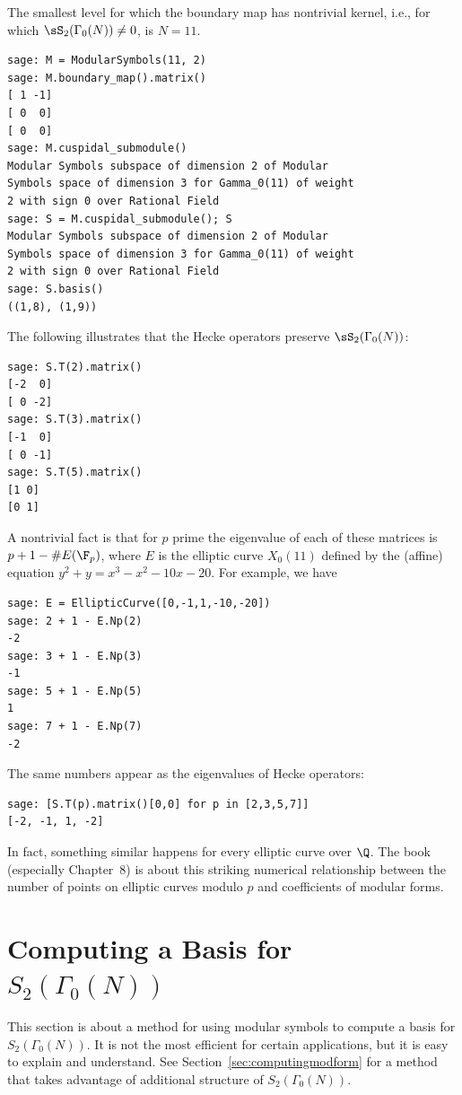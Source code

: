 The smallest level for which the boundary map has nontrivial kernel,
i.e., for which $\sS_2(\Gamma_0(N))\neq 0$, is $N=11$.
\begin{verbatim}
sage: M = ModularSymbols(11, 2)
sage: M.boundary_map().matrix()
[ 1 -1]
[ 0  0]
[ 0  0]
sage: M.cuspidal_submodule()
Modular Symbols subspace of dimension 2 of Modular 
Symbols space of dimension 3 for Gamma_0(11) of weight 
2 with sign 0 over Rational Field
sage: S = M.cuspidal_submodule(); S
Modular Symbols subspace of dimension 2 of Modular 
Symbols space of dimension 3 for Gamma_0(11) of weight 
2 with sign 0 over Rational Field
sage: S.basis()
((1,8), (1,9))
\end{verbatim}%

The following illustrates that the
Hecke operators preserve $\sS_2(\Gamma_0(N))$:
\begin{verbatim}
sage: S.T(2).matrix()
[-2  0]
[ 0 -2]
sage: S.T(3).matrix()
[-1  0]
[ 0 -1]
sage: S.T(5).matrix()
[1 0]
[0 1]
\end{verbatim}%

A nontrivial fact is that for $p$ prime the eigenvalue of each
of these matrices is $p+1 - \#E(\F_p)$, where $E$ is the
elliptic curve $X_0(11)$ defined by the (affine) equation
$y^2 + y = x^3 - x^2 - 10x - 20.$ 
For example, we have
\begin{verbatim}
sage: E = EllipticCurve([0,-1,1,-10,-20])
sage: 2 + 1 - E.Np(2)
-2
sage: 3 + 1 - E.Np(3)
-1
sage: 5 + 1 - E.Np(5)
1
sage: 7 + 1 - E.Np(7)
-2
\end{verbatim}%

The same numbers appear as the eigenvalues
of Hecke operators:
\begin{verbatim}
sage: [S.T(p).matrix()[0,0] for p in [2,3,5,7]]
[-2, -1, 1, -2]
\end{verbatim}
In fact, something similar happens for every elliptic curve over $\Q$.
The book \cite{diamond-shurman} (especially Chapter~8) is about this
striking numerical relationship between the number of 
points on elliptic curves
modulo $p$ and coefficients of modular forms.


\section{Computing a  Basis for $S_2(\Gamma_0(N))$}\label{sec:basiss2one}
This section is about a method for using modular symbols to compute a
basis for $S_2(\Gamma_0(N))$.  It is not the most efficient for
certain applications, but it is  easy to explain and understand.
See Section~\ref{sec:computingmodform} for a method that takes
advantage of additional structure of $S_2(\Gamma_0(N))$.

